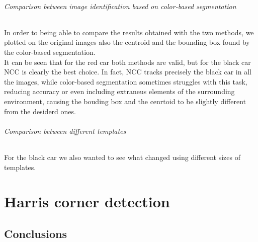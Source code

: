 \subparagraph{Comparison between image identification based on color-based segmentation}
In order to being able to compare the results obtained with the two methods, we plotted on the original images also the centroid and the bounding box found by the 
color-based segmentation.\\ It can be seen that for the red car both methods are valid, but for the black car NCC is clearly the best choice. In fact, NCC tracks precisely the
black car in all the images, while color-based segmentation sometimes struggles with this task, reducing accuracy or even including extraneus elements of the surrounding 
environment, causing the bouding box and the cenrtoid to be slightly different from the desiderd ones.

\subparagraph{Comparison between different templates}
For the black car we also wanted to see what changed using different sizes of templates.





\chapter{Harris corner detection}


\newpage
\section*{Conclusions}



